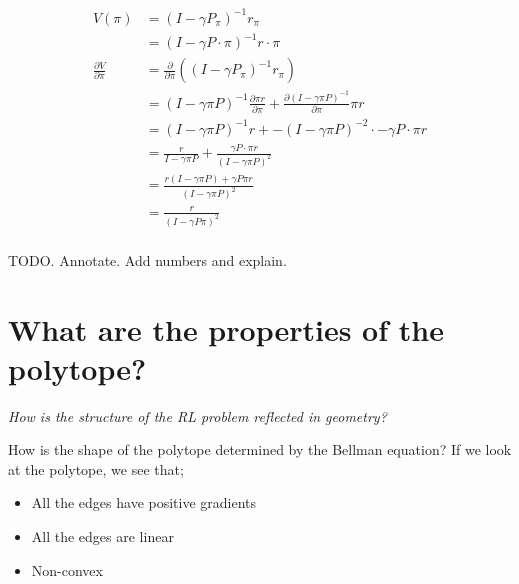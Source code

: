 \begin{align}
V(\pi) &= (I − \gamma P_{\pi})^{−1}r_{\pi} \\
&= (I − \gamma P\cdot \pi)^{−1}r\cdot \pi \\
\frac{\partial V}{\partial \pi} &= \frac{\partial}{\partial \pi}((I-\gamma P_{\pi})^{-1} r_{\pi}) \\
&= (I-\gamma \pi P)^{-1} \frac{\partial \pi r}{\partial \pi}+   \frac{\partial (I-\gamma \pi P)^{-1}}{\partial \pi}\pi r\tag{product rule} \\
&= (I-\gamma \pi P)^{-1} r + -(I-\gamma \pi P)^{-2} \cdot -\gamma P\cdot \pi r\\
&= \frac{r}{I-\gamma \pi P} + \frac{ \gamma P\cdot \pi r}{(I-\gamma \pi P)^2}\\
&= \frac{r(I-\gamma \pi P) + \gamma P \pi r}{(I-\gamma \pi P)^2} \\
& = \frac{r}{(I-\gamma P \pi)^2} \\
\end{align}

TODO. Annotate. Add numbers and explain.



\section{What are the properties of the polytope?}

\begin{displayquote}
  \textit{How is the structure of the RL problem reflected in geometry?}
\end{displayquote}

How is the shape of the polytope determined by the Bellman equation?
If we look at the polytope, we see that;
\begin{itemize}
\tightlist
\item
  All the edges have positive gradients
\item
  All the edges are linear
\item
  Non-convex
\end{itemize}



